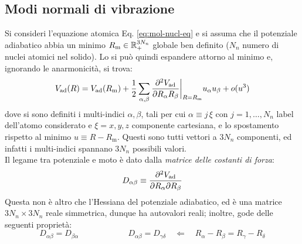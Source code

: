 \subsection{Modi normali di vibrazione}

Si consideri l'equazione atomica Eq. \ref{eq:mol-nucl-eq} e si assuma che il potenziale adiabatico abbia un minimo $ R_\text{m} \in \mathbb{R}_+^{3N_n} $ globale ben definito ($ N_n $ numero di nuclei atomici nel solido). Lo si può quindi espandere attorno al minimo e, ignorando le anarmonicità, si trova:
\begin{equation}
	V_\text{ad}(R) = V_\text{ad}(R_\text{m}) + \frac{1}{2} \sum_{\alpha,\beta} \frac{\partial^2 V_\text{ad}}{\partial R_\alpha R_\beta}\bigg\vert_{R = R_\text{m}} u_\alpha u_\beta + o(u^3)
\end{equation}
dove si sono definiti i multi-indici $ \alpha , \beta $, tali per cui $ \alpha \equiv j\,\xi $ con $ j = 1, \dots, N_n $ label dell'atomo considerato e $ \xi = x,y,z $ componente cartesiana, e lo spostamento rispetto al minimo $ u \equiv R - R_\text{m} $. Questi sono tutti vettori a $ 3N_n $ componenti, ed infatti i multi-indici spannano $ 3N_n $ possibili valori. \\
Il legame tra potenziale e moto è dato dalla \textit{matrice delle costanti di forza}:
\begin{equation}
	D_{\alpha \beta} \equiv \frac{\partial^2 V_\text{ad}}{\partial R_\alpha \partial R_\beta}
\end{equation}
Questa non è altro che l'Hessiana del potenziale adiabatico, ed è una matrice $ 3N_n \times 3N_n $ reale simmetrica, dunque ha autovalori reali; inoltre, gode delle seguenti proprietà:
\begin{equation}
	D_{\alpha \beta} = D_{\beta \alpha}
	\qquad \qquad \qquad
	D_{\alpha \beta} = D_{\gamma \delta}
	\quad \Leftarrow \quad
	R_\alpha - R_\beta = R_\gamma - R_\delta
	\label{eq:d-inv}
\end{equation}


